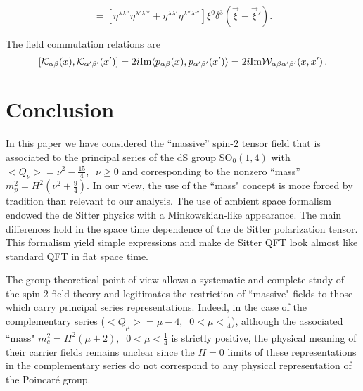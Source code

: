\documentclass[a4paper,11pt,showpacs,preprintnumbers]{revtex4}
\begin{document}
\begin{equation}
[a^{\lambda\lambda'}(\xi),a^{\dagger\lambda''\lambda'''}(\xi')]=
\left[\eta^{\lambda\lambda''}\eta^{\lambda'\lambda'''}
+\eta^{\lambda\lambda'}\eta^{\lambda''\lambda'''}\right]\xi^0\delta^3(\vec\xi-\vec\xi').
\end{equation}


The field commutation relations are
\begin{equation}
\left[{\cal K}_{\alpha\beta}(x),{\cal
K}_{\alpha'\beta'}(x')\right]=2i \mbox{Im} \langle
p_{\alpha\beta}(x),p_{\alpha'\beta'}(x')\rangle=2i \mbox{Im}{\cal
W}_{\alpha\beta\alpha'\beta'}(x,x') \,.
\end{equation}



\section{Conclusion}

In this paper we have considered the ``massive'' spin-$2$ tensor
field that is associated to the principal series of the dS group
SO$_{0}(1,4)$ with $<Q_\nu>=\nu^2-\frac{15}{4},\;\;\nu \geq 0 $
and corresponding to the nonzero ``mass''
$m_p^2=H^2(\nu^2+\frac{9}{4})$. In our view, the use of the
``mass" concept is more forced by tradition than relevant to our
analysis. The use of ambient space formalism endowed the de Sitter
physics with a Minkowskian-like appearance. The main differences
hold in  the space time dependence of the de Sitter polarization
tensor. This formalism yield simple expressions and make de Sitter
QFT look almost like standard QFT in flat space time.

The group theoretical point of view allows a systematic and
complete study of the spin-2 field theory and legitimates the
restriction of ``massive" fields to those which carry principal
series representations. Indeed, in the case of the complementary
series ($<Q_\mu>=\mu-4,\;\;0<\mu <\frac{1}{4}$), although the
associated ``mass" $m_c^2=H^2(\mu+2),\;\;0<\mu <\frac{1}{4}$ is
strictly positive, the physical meaning of their carrier fields
remains unclear since the $H=0$ limits of these representations in
the complementary series do not correspond to any physical
representation of the Poincar\'e group.
\end{document}
